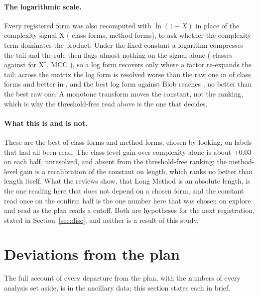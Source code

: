 \documentclass[11pt,a4paper]{article}
\newcommand{\Xs}{X$^*$}
\begin{document}
\paragraph{The logarithmic scale.} Every registered form was also recomputed
with $\ln(1 + X)$ in place of the complexity signal X (\logClassForms{}
class forms, \logMethodForms{} method forms), to ask whether the complexity
term dominates the product. Under the fixed constant a logarithm compresses
the tail and the rule then flags almost nothing on the signal alone
(\logXFlagsLog{} classes against \logXFlagsRaw{} for \Xs{}, MCC
\logXMccLog{}), so a log form recovers only where a factor re-expands the
tail; across the matrix the log form is resolved worse than the raw one in
\logClassWorse{} of \logClassForms{} class forms and better in
\logClassBetter{}, and the best log form against Blob reaches
\logClassTopMcc{}, no better than the best raw one. A monotone transform
moves the constant, not the ranking, which is why the threshold-free read
above is the one that decides.

\paragraph{What this is and is not.} These are the best of
\expClassForms{} class forms and \expMethodForms{} method forms, chosen by
looking, on labels that had all been read. The class-level gain over complexity alone is about +0.03 on each half,
unresolved, and absent from the threshold-free ranking; the method-level
gain is a recalibration of the constant on length, which ranks no better
than length itself. What the reviews show, that Long Method is an absolute
length, is the one reading here that does not depend on a chosen form, and
the constant read once on the confirm half is the one number here that was
chosen on explore and read as the plan reads a cutoff. Both are hypotheses for the
next registration, stated in Section~\ref{sec:disc}, and neither is a result
of this study.

\section{Deviations from the plan}
\label{sec:deviations}

The full account of every departure from the plan, with the numbers of
every analysis set aside, is in the ancillary data; this section states
each in brief.
\end{document}
